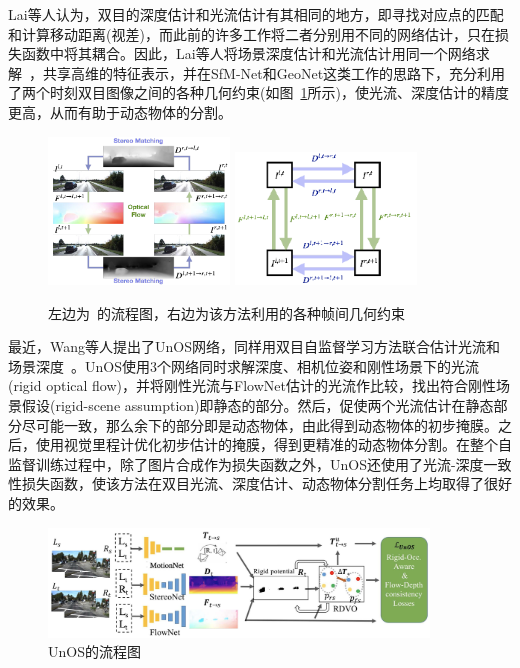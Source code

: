 Lai等人认为，双目的深度估计和光流估计有其相同的地方，即寻找对应点的匹配和计算移动距离(视差)，而此前的许多工作将二者分别用不同的网络估计，只在损失函数中将其耦合。因此，Lai等人将场景深度估计和光流估计用同一个网络求解~\cite{bridging}，共享高维的特征表示，并在SfM-Net和GeoNet这类工作的思路下，充分利用了两个时刻双目图像之间的各种几何约束(如图~\ref{bridge}所示)，使光流、深度估计的精度更高，从而有助于动态物体的分割。

\begin{figure}[htbp]
	\centering
	\includegraphics[width=0.43\textwidth]{figs/1-2/bridge1.png}
	\hspace{30pt}
	\includegraphics[width=0.43\textwidth]{figs/1-2/bridge2.png}
	\caption{左边为~\cite{bridging}的流程图，右边为该方法利用的各种帧间几何约束}
	\label{bridge}
\end{figure}

最近，Wang等人提出了UnOS网络，同样用双目自监督学习方法联合估计光流和场景深度~\cite{unos}。UnOS使用3个网络同时求解深度、相机位姿和刚性场景下的光流(rigid optical flow)，并将刚性光流与FlowNet估计的光流作比较，找出符合刚性场景假设(rigid-scene assumption)即静态的部分。然后，促使两个光流估计在静态部分尽可能一致，那么余下的部分即是动态物体，由此得到动态物体的初步掩膜。之后，使用视觉里程计优化初步估计的掩膜，得到更精准的动态物体分割。在整个自监督训练过程中，除了图片合成作为损失函数之外，UnOS还使用了光流-深度一致性损失函数，使该方法在双目光流、深度估计、动态物体分割任务上均取得了很好的效果。

\begin{figure}[htbp]
	\centering
	\includegraphics[width=0.9\textwidth]{figs/1-2/unos.jpg} 
	\caption{UnOS的流程图}
	\label{fig:unos}
\end{figure}


